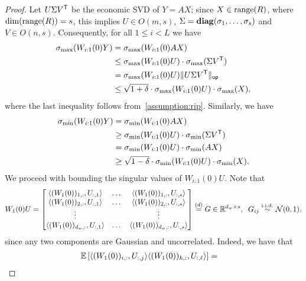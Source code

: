 \begin{proof}
    Let $U \Sigma V^{\mathsf{T}}$ be the economic SVD of $Y = AX$; since
    $X \in \mathrm{range}(R)$, where $\dim(\mathrm{range}(R)) = s$, this implies
    $U \in O(m, s)$, $\Sigma = \mathbf{diag}(\sigma_1, \dots, \sigma_{s})$
    and $V \in O(n, s)$. Consequently, for all $1 \leq i < L$ we have
    \begin{align}
        \sigma_{\max}(W_{i:1}(0) Y) &=
        \sigma_{\max}(W_{i:1}(0) AX) \notag \\ 
        & \leq \sigma_{\max}(W_{i:1}(0) U) \cdot \sigma_{\max}(\Sigma V^{\mathsf{T}}) \notag \\
        &= \sigma_{\max}(W_{i:1}(0) U) \lVert U \Sigma V^{\mathsf{T}}\rVert_{\mathsf{op}} \notag \\
        &\leq \sqrt{1 + \delta} \cdot \sigma_{\max}(W_{i:1}(0) U) \cdot \sigma_{\max}(X),
        \label{eq:w1y-ub}
    \end{align}
    where the last inequality follows from~\cref{assumption:rip}.
    Similarly, we have
    \begin{align}
        \sigma_{\min}(W_{i:1}(0) Y) &=
        \sigma_{\min}(W_{i:1}(0) AX) \notag \\ 
        & \geq \sigma_{\min}(W_{i:1}(0) U) \cdot \sigma_{\min}(\Sigma V^{\mathsf{T}}) \notag \\
        &= \sigma_{\min}(W_{i:1}(0) U) \cdot \sigma_{\min}(AX) \notag \\
        &\geq \sqrt{1 - \delta} \cdot \sigma_{\min}(W_{i:1}(0) U) \cdot \sigma_{\min}(X).
        \label{eq:w1y-lb}
    \end{align}
	We proceed with bounding the singular values of $W_{i:1}(0)U$. Note that
	\begin{equation}
		W_{1}(0) U = \begin{bmatrix}
			\langle(W_{1}(0))_{1, :}, U_{:, 1}\rangle & \dots & \langle(W_{1}(0))_{1, :}, U_{:, s}\rangle \\
			\langle(W_{1}(0))_{2, :}, U_{:, 1}\rangle & \dots & \langle(W_{1}(0))_{2, :}, U_{:, s}\rangle \\
			\vdots                  &       & \vdots                  \\
			\langle(W_{1}(0))_{d_{w}, :}, U_{:, 1}\rangle & \dots & \langle(W_{1}(0))_{d_{w}, :}, U_{:, s}\rangle
		\end{bmatrix}
		\overset{(d)}{=} G \in \mathbb{R}^{d_{w} \times s}, \;\;
		G_{ij} \overset{\mathrm{i.i.d.}}{\sim} \mathcal{N}(0, 1),
		\label{eq:AR-product}
	\end{equation}
	since any two components are Gaussian and uncorrelated.
    Indeed, we have that
	\begin{align*}
		\expec{\ip{(W_1(0))_{i, :}, U_{:, j}} \ip{(W_{1}(0))_{k, :}, U_{:, \ell}}} & =

\end{align*}
\end{proof}
